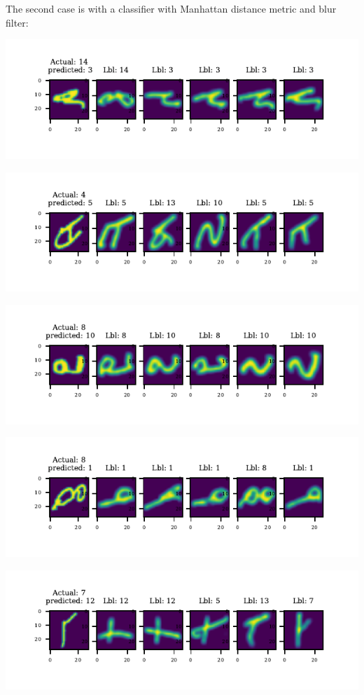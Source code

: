 \documentclass[11pt]{article}
\begin{document}
The second case is with a classifier with Manhattan distance metric and blur filter:

\includegraphics{figures/1i[2]_miss_classified_0.pdf}

\includegraphics{figures/1i[2]_miss_classified_1.pdf}

\includegraphics{figures/1i[2]_miss_classified_2.pdf}

\includegraphics{figures/1i[2]_miss_classified_3.pdf}

\includegraphics{figures/1i[2]_miss_classified_4.pdf}
\end{document}
